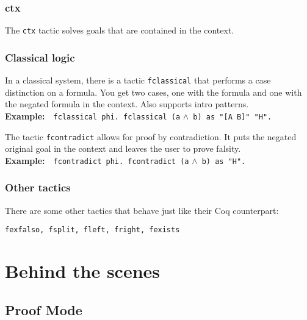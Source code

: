 \documentclass[12pt, a4paper]{article}
\newcommand{\coq}[1]{\texttt{#1}}
\newcommand{\example}[1]{\medskip\\\textbf{Example:}~~#1}
\begin{document}
\subsubsection{\ttfamily ctx}

The \texttt{ctx} tactic solves goals that are contained in the context.


\subsubsection{Classical logic}

In a classical system, there is a tactic \texttt{fclassical} that performs a case distinction on a formula.
You get two cases, one with the formula and one with the negated formula in the context.
Also supports intro patterns.
\example{\coq{fclassical phi. fclassical (a} $\land$\coq{ b) as "[A B]" "H".}}

\medskip\noindent
The tactic \texttt{fcontradict} allows for proof by contradiction.
It puts the negated original goal in the context and leaves the user to prove falsity.
\example{\coq{fcontradict phi. fcontradict (a} $\land$\coq{ b) as "H".}}


\subsubsection{Other tactics}

There are some other tactics that behave just like their Coq counterpart:
\begin{center}
	\texttt{fexfalso, fsplit, fleft, fright, fexists}
\end{center}




\section{Behind the scenes}


\subsection{Proof Mode}
\end{document}
